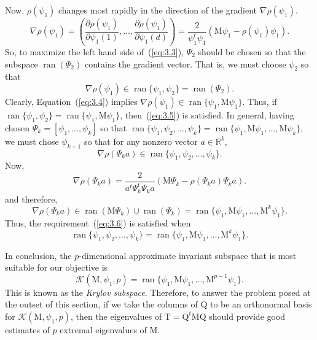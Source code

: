 \documentclass[12pt,letterpaper]{report}
\theoremstyle{plain}
\theoremstyle{definition}
\theoremstyle{remark}
\numberwithin{theorem}{chapter}
\numberwithin{claim}{chapter}
\numberwithin{equation}{chapter}
\numberwithin{conjecture}{chapter}
\newcommand\sK{\ensuremath{\mathcal{K}}}
\newcommand\R{\ensuremath{\mathbb{R}}}
\newcommand\M{\ensuremath{\mathrm{M}}}
\newcommand\T{\ensuremath{\mathrm{T}}}
\newcommand\Q{\ensuremath{\mathrm{Q}}}
\newcommand\ran{\ensuremath{\operatorname{ran}}}
\newcommand\<{\ensuremath{\langle}}
\renewcommand\>{\ensuremath{\rangle}}
\begin{document}
Now, $\rho(\psi_1)$ changes most rapidly in the direction of the gradient
$\nabla \rho(\psi_1)$.
\begin{equation}
  \label{eq:3.4}
\nabla \rho(\psi_1) = \left(\frac{\partial \rho(\psi_1)}{\partial \psi_1(1)}, \dots,
\frac{\partial \rho(\psi_1)}{\partial \psi_1(d)}\right)
 = \frac{2}{\psi_1^t\psi_1} (\M\psi_1 - \rho(\psi_1)\psi_1).
\end{equation}
So, to maximize the left hand side of~(\ref{eq:3.3}), $\Psi_2$ should be chosen
so that the subspace $\ran(\Psi_2)$ contains the gradient vector.
That is, we must choose $\psi_2$ so that
\begin{equation}
\label{eq:3.5}
\nabla \rho(\psi_1) \in \ran\{\psi_1, \psi_2\} = \ran(\Psi_2).
\end{equation}
Clearly, Equation~(\ref{eq:3.4}) implies 
$\nabla \rho(\psi_1) \in \ran\{\psi_1, \M\psi_1\}$.
Thus, if $\ran\{\psi_1, \psi_2\} = \ran\{\psi_1, \M\psi_1\}$, 
then~(\ref{eq:3.5}) is satisfied.
%
%
%
%
In general, having chosen $\Psi_k = [\psi_1, \dots,  \psi_k]$ so that
$\ran\{\psi_1, \psi_2, \dots, \psi_k\} = \ran\{\psi_1, \M\psi_1, \dots,
\M\psi_k\}$,
we must chose $\psi_{k+1}$ so that for any nonzero vector $a\in \R^k$,
\begin{equation}
\label{eq:3.6}
\nabla \rho(\Psi_ka) \in \ran\{\psi_1, \psi_2, \dots, \psi_k\}.
\end{equation}
Now,
\[
\nabla \rho(\Psi_ka)   
 = \frac{2}{a^t\Psi_k^t\Psi_ka} (\M\Psi_k - \rho(\Psi_ka)\Psi_ka).
\]
and therefore,
\[
\nabla \rho(\Psi_ka)  \in 
\ran(\M\Psi_k) \cup \ran(\Psi_k) = \ran\{\psi_1, \M\psi_1, \dots, \M^k\psi_1\}.
\]
Thus, the requirement~(\ref{eq:3.6}) is satisfied when 
\[
\ran\{\psi_1, \psi_2, \dots, \psi_k\} = \ran\{\psi_1, \M\psi_1, \dots,
\M^k\psi_1\}.
\]

In conclusion, the $p$-dimensional approximate invariant subspace that is most suitable
for our objective is
\[
\sK(\M, \psi_1, p) = \ran\{\psi_1, \M\psi_1, \dots, \M^{p-1}\psi_1\}.
\]
This is known as the \emph{Krylov subspace}. Therefore, to answer the problem posed at the outset
of this section, if we take the columns of $\Q$ to be an orthonormal basis for 
$\sK(\M,\psi_1, p)$, then the eigenvalues of $\T = \Q^t\M\Q$ should provide good
estimates of $p$ extremal eigenvalues of $\M$. 
%
%
%
%


\end{document}
